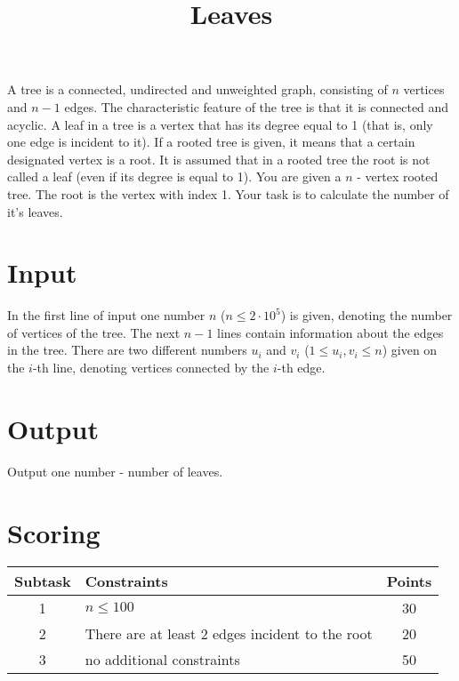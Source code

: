 \documentclass[zad,zawodnik,utf8,en]{sinol}
\title{Leaves}
\begin{document}
\begin{tasktext}

    \noindent A tree is a connected, undirected and unweighted graph,
    consisting of $n$ vertices and $n-1$ edges.
    The characteristic feature of the tree is that it is connected and acyclic.
    A leaf in a tree is a vertex that has its degree equal to 1
    (that is, only one edge is incident to it).
    If a rooted tree is given, it means that a certain designated vertex is a root.
    It is assumed that in a rooted tree the root is not called a leaf
    (even if its degree is equal to 1).
    You are given a $n$ - vertex rooted tree.
    The root is the vertex with index 1.
    Your task is to calculate the number of it's leaves.

\section{Input}

    In the first line of input one number $n$ ($n \leq 2 \cdot 10^5$) is given,
    denoting the number of vertices of the tree.
    The next $n-1$ lines contain information about the edges in the tree.
    There are two different numbers $u_i$ and $v_i$ ($1 \leq u_i, v_i \leq n$)
    given on the $i$-th line, denoting vertices connected by the $i$-th edge.

\section{Output}

    Output one number - number of leaves.

\examplesection

\section{Scoring}

    \begin{center}
        \begin{tabular}{|c|p{5cm}|c|}
            \hline
            \textbf{Subtask} & \textbf{Constraints} & \textbf{Points} \\
            \hline
            1 & $n \leq 100$ & 30 \\
            \hline
            2 & There are at least 2 edges incident to the root & 20 \\
            \hline
            3 & no additional constraints & 50 \\
            \hline
        \end{tabular}
    \end{center}

\end{tasktext}
\end{document}
